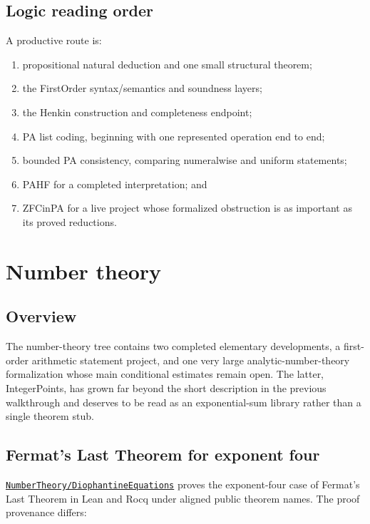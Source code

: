 \documentclass[
  10pt,
  a4paper,
  twoside,
  open=any,
  parskip=half,
  headings=big
]{scrreprt}
\newcommand{\CommitFull}{56a402bf82a9aab119fcbe3e96b991d387b221c5}
\newcommand{\RepoWeb}{https://github.com/VladimirReshetnikov/ProveIt}
\newcommand{\RepoTreeBase}{\RepoWeb/tree/\CommitFull}
\newcommand{\project}[1]{\textsf{#1}}
\newcommand{\RepoDir}[1]{\href{\RepoTreeBase/#1}{\nolinkurl{#1}}}
\begin{document}
\section{Logic reading order}

A productive route is:

\begin{enumerate}
  \item propositional natural deduction and one small structural theorem;
  \item the FirstOrder syntax/semantics and soundness layers;
  \item the Henkin construction and completeness endpoint;
  \item PA list coding, beginning with one represented operation end to end;
  \item bounded PA consistency, comparing numeralwise and uniform statements;
  \item PAHF for a completed interpretation; and
  \item ZFCinPA for a live project whose formalized obstruction is as important as its proved reductions.
\end{enumerate}

\chapter{Number theory}
\label{ch:number-theory}

\section{Overview}

The number-theory tree contains two completed elementary developments, a first-order arithmetic statement project, and one very large analytic-number-theory formalization whose main conditional estimates remain open. The latter, \project{IntegerPoints}, has grown far beyond the short description in the previous walkthrough and deserves to be read as an exponential-sum library rather than a single theorem stub.

\section{Fermat's Last Theorem for exponent four}
\label{sec:fermat-four}

\RepoDir{NumberTheory/DiophantineEquations} proves the exponent-four case of Fermat's Last Theorem in Lean and Rocq under aligned public theorem names. The proof provenance differs:
\end{document}
